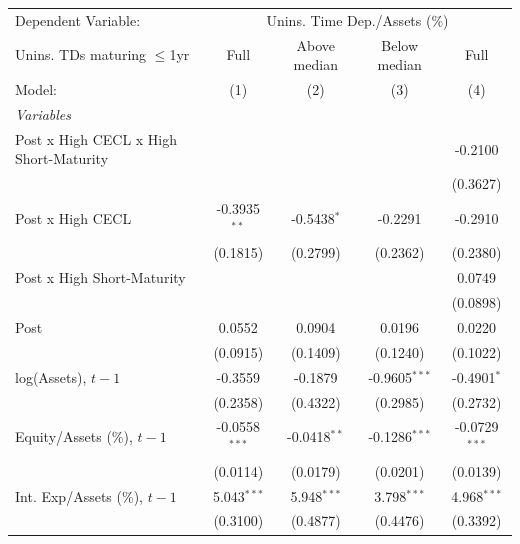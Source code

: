 
\begingroup
\centering
\begin{tabular}{lcccc}
   \tabularnewline \midrule \midrule
   Dependent Variable: & \multicolumn{4}{c}{Unins. Time Dep./Assets (\%)}\\
   Unins. TDs maturing $\leq$1yr          & Full            & Above median   & Below median    & Full \\   
   Model:                                 & (1)             & (2)            & (3)             & (4)\\  
   \midrule
   \emph{Variables}\\
   Post x High CECL x High Short-Maturity &                 &                &                 & -0.2100\\   
                                          &                 &                &                 & (0.3627)\\   
   Post x High CECL                       & -0.3935$^{**}$  & -0.5438$^{*}$  & -0.2291         & -0.2910\\   
                                          & (0.1815)        & (0.2799)       & (0.2362)        & (0.2380)\\   
   Post x High Short-Maturity             &                 &                &                 & 0.0749\\   
                                          &                 &                &                 & (0.0898)\\   
   Post                                   & 0.0552          & 0.0904         & 0.0196          & 0.0220\\   
                                          & (0.0915)        & (0.1409)       & (0.1240)        & (0.1022)\\   
   log(Assets), $t{-}1$                   & -0.3559         & -0.1879        & -0.9605$^{***}$ & -0.4901$^{*}$\\   
                                          & (0.2358)        & (0.4322)       & (0.2985)        & (0.2732)\\   
   Equity/Assets (\%), $t{-}1$            & -0.0558$^{***}$ & -0.0418$^{**}$ & -0.1286$^{***}$ & -0.0729$^{***}$\\   
                                          & (0.0114)        & (0.0179)       & (0.0201)        & (0.0139)\\   
   Int. Exp/Assets (\%), $t{-}1$          & 5.043$^{***}$   & 5.948$^{***}$  & 3.798$^{***}$   & 4.968$^{***}$\\   
                                          & (0.3100)        & (0.4877)       & (0.4476)        & (0.3392)\\   

\end{tabular}
